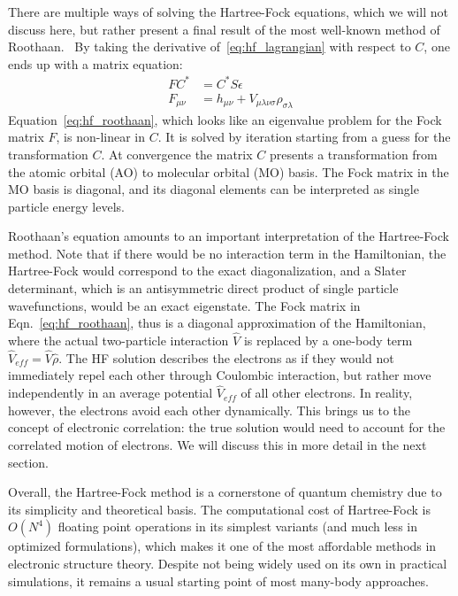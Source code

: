 There are multiple ways of solving the Hartree-Fock equations, which we will 
not discuss here, but rather present a final result of the most well-known 
method of Roothaan.~\cite{roothaan1951new} By taking the derivative 
of~\ref{eq:hf_lagrangian} with respect to $C$, one ends up with a matrix 
equation:
%
\begin{equation}
\begin{aligned}
 FC^{\ast} &=  C^{\ast} S \epsilon\\
 F_{\mu \nu} &= h_{\mu \nu} + V_{\mu \lambda \nu \sigma} \rho_{\sigma \lambda} 
 \label{eq:hf_roothaan}
\end{aligned}
\end{equation}
%
Equation~\ref{eq:hf_roothaan}, which looks like an eigenvalue problem for 
the Fock matrix $F$, is non-linear in $C$. It is solved by iteration starting 
from a guess for the transformation $C$. At convergence the matrix $C$ presents 
a transformation from the atomic orbital (AO) to molecular orbital (MO) basis. 
The Fock matrix in the MO basis is diagonal, and its diagonal elements can be 
interpreted as single particle energy levels. 

Roothaan's equation amounts to an important interpretation of the 
Hartree-Fock method. Note that if there would be no interaction term in the 
Hamiltonian, the Hartree-Fock would correspond to the exact 
diagonalization, and a Slater determinant, which is an antisymmetric direct 
product of single particle wavefunctions, would be an exact 
eigenstate. The Fock matrix in Eqn.~\ref{eq:hf_roothaan}, thus is a diagonal
approximation of the Hamiltonian, where the actual two-particle interaction 
$\hat{V}$ is replaced by a one-body term $\hat{V}_{eff} = \hat{V} \hat{\rho}$. 
The HF solution describes the electrons as if they would not immediately repel 
each other through Coulombic interaction, but rather move 
independently in an average potential $\hat{V}_{eff}$ of all other electrons. 
In reality, however, the electrons avoid each other dynamically. This brings us 
to the concept of electronic correlation: the true solution would need to 
account for the correlated motion of electrons. We will discuss this in more 
detail in the next section.

Overall, the Hartree-Fock method is a cornerstone of quantum chemistry due to 
its simplicity and theoretical basis. The computational cost of Hartree-Fock is 
$O(N^4)$ floating point operations in its simplest variants (and much less 
in optimized formulations\cite{goedecker1999linear}), which makes it one of the 
most affordable methods in electronic structure theory. Despite not being 
widely used on its own in practical simulations, it remains a usual starting 
point of most many-body approaches.


